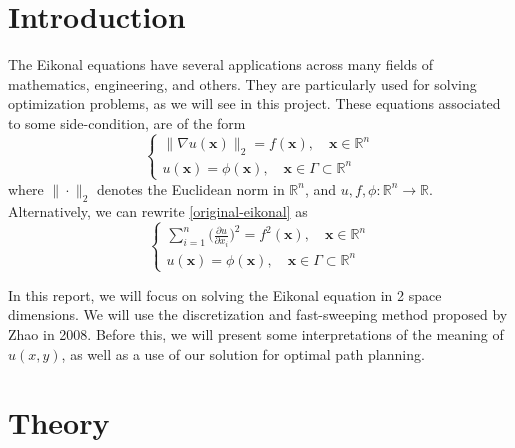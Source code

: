 \documentclass[11pt]{article}
\theoremstyle{definition}
\theoremstyle{remark}
\newcommand{\R}{\mathbb{R}}
\begin{document}
\section{Introduction}
\label{sec:intro}
The Eikonal equations have several applications across many fields of mathematics, engineering, and others. They are particularly used for solving optimization problems, as we will see in this project. These equations associated to some side-condition, are of the form \\
\begin{equation}
\label{original-eikonal}
    \begin{cases}
        \|\nabla u(\textbf{x})\|_2=f(\textbf{x}) , \quad\textbf{x} \in\R^n\\
        u(\textbf{x})=\phi(\textbf{x}),\quad \textbf{x} \in \Gamma \subset \R^n
    \end{cases}
\end{equation}
where $\|\cdot\|_2$ denotes the Euclidean norm in $\R^n$, and $u,f,\phi:\R^n\xrightarrow{}\R$. Alternatively, we can rewrite \eqref{original-eikonal} as 
\begin{equation}
    \begin{cases}
        \sum_{i=1}^{n}\big(\frac{\partial u}{\partial x_i}\big)^2=f^2(\textbf{x}) , \quad\textbf{x} \in\R^n\\
        u(\textbf{x})=\phi(\textbf{x}),\quad \textbf{x} \in \Gamma \subset \R^n
    \end{cases}
\end{equation}

\noindent In this report, we will focus on solving the Eikonal equation in 2 space dimensions. We will use the discretization and fast-sweeping method proposed by Zhao in 2008. Before this, we will present some interpretations of the meaning of $u(x,y)$, as well as a use of our solution for optimal path planning.

\section{Theory}
\end{document}

